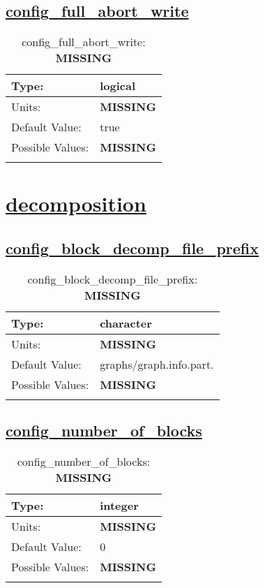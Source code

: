 \subsection[config\_full\_abort\_write]{\hyperref[sec:nm_tab_io]{config\_full\_abort\_write}}
\label{subsec:nm_sec_config_full_abort_write}
\begin{center}
\begin{longtable}{| p{2.0in} || p{4.0in} |}
    \hline
    Type: & logical \\
    \hline
    Units: & {\bf \color{red} MISSING} \\
    \hline
    Default Value: & true \\
    \hline
    Possible Values: & {\bf \color{red} MISSING} \\
    \hline
    \caption{config\_full\_abort\_write: {\bf \color{red} MISSING}}
\end{longtable}
\end{center}
\section[decomposition]{\hyperref[sec:nm_tab_decomposition]{decomposition}}
\label{sec:nm_sec_decomposition}
\subsection[config\_block\_decomp\_file\_prefix]{\hyperref[sec:nm_tab_decomposition]{config\_block\_decomp\_file\_prefix}}
\label{subsec:nm_sec_config_block_decomp_file_prefix}
\begin{center}
\begin{longtable}{| p{2.0in} || p{4.0in} |}
    \hline
    Type: & character \\
    \hline
    Units: & {\bf \color{red} MISSING} \\
    \hline
    Default Value: & graphs/graph.info.part. \\
    \hline
    Possible Values: & {\bf \color{red} MISSING} \\
    \hline
    \caption{config\_block\_decomp\_file\_prefix: {\bf \color{red} MISSING}}
\end{longtable}
\end{center}
\subsection[config\_number\_of\_blocks]{\hyperref[sec:nm_tab_decomposition]{config\_number\_of\_blocks}}
\label{subsec:nm_sec_config_number_of_blocks}
\begin{center}
\begin{longtable}{| p{2.0in} || p{4.0in} |}
    \hline
    Type: & integer \\
    \hline
    Units: & {\bf \color{red} MISSING} \\
    \hline
    Default Value: & 0 \\
    \hline
    Possible Values: & {\bf \color{red} MISSING} \\
    \hline
    \caption{config\_number\_of\_blocks: {\bf \color{red} MISSING}}
\end{longtable}
\end{center}
